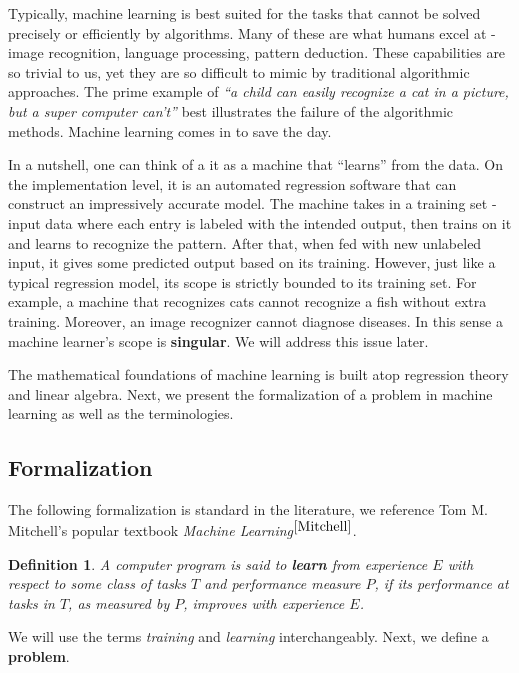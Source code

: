\documentclass[12pt]{article}  %
\newtheorem{definition}{Definition}
\begin{document}
Typically, machine learning is best suited for the tasks that cannot be solved precisely or efficiently by algorithms. Many of these are what humans excel at - image recognition, language processing, pattern deduction. These capabilities are so trivial to us, yet they are so difficult to mimic by traditional algorithmic approaches. The prime example of {\em ``a child can easily recognize a cat in a picture, but a super computer can't''} best illustrates the failure of the algorithmic methods. Machine learning comes in to save the day.

In a nutshell, one can think of a it as a machine that ``learns'' from the data. On the implementation level, it is an automated regression software that can construct an impressively accurate model. The machine takes in a training set - input data where each entry is labeled with the intended output, then trains on it and learns to recognize the pattern. After that, when fed with new unlabeled input, it gives some predicted output based on its training. However, just like a typical regression model, its scope is strictly bounded to its training set. For example, a machine that recognizes cats cannot recognize a fish without extra training. Moreover, an image recognizer cannot diagnose diseases. In this sense a machine learner's scope is {\bf singular}. We will address this issue later.

The mathematical foundations of machine learning is built atop regression theory and linear algebra. Next, we present the formalization of a problem in machine learning as well as the terminologies.


\subsection{Formalization}

The following formalization is standard in the literature, we reference Tom M. Mitchell's popular textbook {\em Machine Learning}$^{\ref{Mitchell}}$.


\begin{definition}
A computer program is said to {\bf \em learn} from experience $E$ with respect to some class of tasks $T$ and performance measure $P$, if its performance at tasks in $T$, as measured by $P$, improves with experience $E$.
\end{definition}

We will use the terms {\em training} and {\em learning} interchangeably. Next, we define a {\bf problem}.
\end{document}
